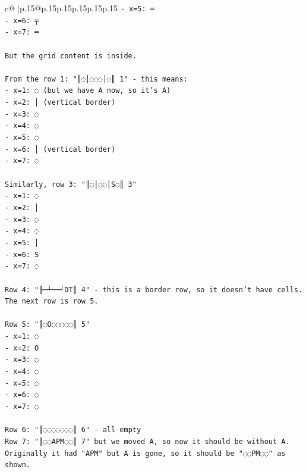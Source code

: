 \documentclass{article}
\begin{document}
{\begin{supertabular}{c@{$\;$}|p{.15\linewidth}@{}p{.15\linewidth}p{.15\linewidth}p{.15\linewidth}p{.15\linewidth}p{.15\linewidth}}
{{{\texttt{{-} x=5: ═} \\
\texttt{{-} x=6: ╤} \\
\texttt{{-} x=7: ═} \\
\\ 
\texttt{But the grid content is inside.} \\
\\ 
\texttt{From the row 1: "║◌│◌◌◌│◌║ 1" {-} this means:} \\
\texttt{{-} x=1: ◌ (but we have A now, so it's A)} \\
\texttt{{-} x=2: │ (vertical border)} \\
\texttt{{-} x=3: ◌} \\
\texttt{{-} x=4: ◌} \\
\texttt{{-} x=5: ◌} \\
\texttt{{-} x=6: │ (vertical border)} \\
\texttt{{-} x=7: ◌} \\
\\ 
\texttt{Similarly, row 3: "║◌│◌◌│S◌║ 3"} \\
\texttt{{-} x=1: ◌} \\
\texttt{{-} x=2: │} \\
\texttt{{-} x=3: ◌} \\
\texttt{{-} x=4: ◌} \\
\texttt{{-} x=5: │} \\
\texttt{{-} x=6: S} \\
\texttt{{-} x=7: ◌} \\
\\ 
\texttt{Row 4: "╟─┴──┘DT║ 4" {-} this is a border row, so it doesn't have cells. The next row is row 5.} \\
\\ 
\texttt{Row 5: "║◌O◌◌◌◌◌║ 5"} \\
\texttt{{-} x=1: ◌} \\
\texttt{{-} x=2: O} \\
\texttt{{-} x=3: ◌} \\
\texttt{{-} x=4: ◌} \\
\texttt{{-} x=5: ◌} \\
\texttt{{-} x=6: ◌} \\
\texttt{{-} x=7: ◌} \\
\\ 
\texttt{Row 6: "║◌◌◌◌◌◌◌║ 6" {-} all empty} \\
\texttt{Row 7: "║◌◌APM◌◌║ 7" but we moved A, so now it should be without A. Originally it had "APM" but A is gone, so it should be "◌◌PM◌◌" as shown.} \\
}}}
\end{supertabular}}
\end{document}
